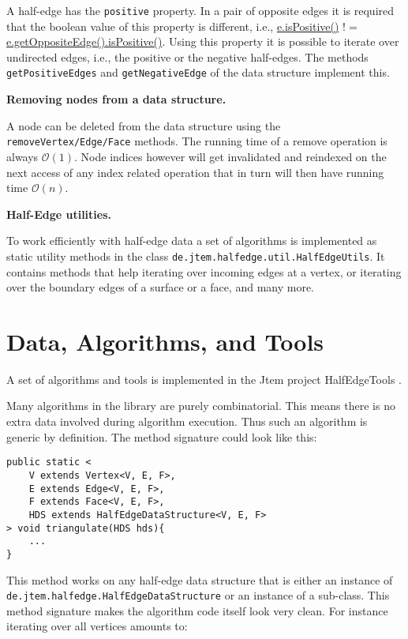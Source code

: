 \documentclass[Thesis.tex]{subfiles}
\begin{document}
A half-edge has the {\tt positive} property. In a pair of opposite edges it is required that the boolean
value of this property is different, i.e., \url{e.isPositive()} $!=$ \url{e.getOppositeEdge().isPositive()}.
Using this property it is possible to iterate over undirected edges, i.e., the positive or the negative
half-edges. The methods {\tt getPositiveEdges} and {\tt getNegativeEdge} of the data structure 
implement this.

{\bf Removing nodes from a data structure.}

A node can be deleted from the data structure using the {\tt removeVertex/Edge/Face} methods.
The running time of a remove operation is always $\mathcal{O}(1)$. Node indices however will
get invalidated and reindexed on the next access of any index related operation that in turn will
then have running time $\mathcal{O}(n)$.

{\bf Half-Edge utilities.}

To work efficiently with half-edge data a set of algorithms is implemented as static utility methods
in the class {\tt de.jtem.half\-edge.util.Half\-Edge\-Utils}. It contains methods that help iterating 
over incoming edges at a vertex, or iterating over the boundary edges of a surface or a face, and many more.


\section{Data, Algorithms, and Tools}

A set of algorithms and tools is implemented in the {\sc Jtem} project {\sc HalfEdgeTools}
\cite{JtemWebsite}. 

Many algorithms in the library are purely combinatorial. This means there is no extra data 
involved during algorithm execution. Thus such an algorithm is generic by definition. The
method signature could look like this:

\begin{lstlisting}
public static <
	V extends Vertex<V, E, F>,
	E extends Edge<V, E, F>,
	F extends Face<V, E, F>,
	HDS extends HalfEdgeDataStructure<V, E, F>
> void triangulate(HDS hds){
	...
}
\end{lstlisting}

This method works on any half-edge data structure that is either an instance of {\tt
de.jtem.half\-edge.HalfEdgeDataStructure} or an instance of a sub-class. This method
signature makes the algorithm code itself look very clean. For instance iterating over
all vertices amounts to:
\end{document}
